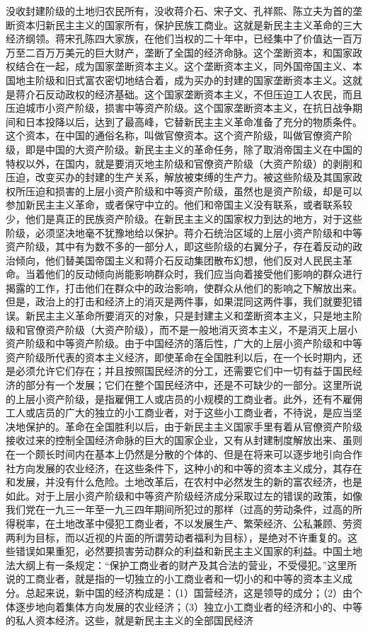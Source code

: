 \documentclass[UTF-8, a5paper, 12pt]{ctexart}
\begin{document}
没收封建阶级的土地归农民所有，没收蒋介石、宋子文、孔祥熙、陈立夫为首的垄断资本归新民主主义的国家所有，保护民族工商业。这就是新民主主义革命的三大经济纲领。蒋宋孔陈四大家族，在他们当权的二十年中，已经集中了价值达一百万万至二百万万美元的巨大财产，垄断了全国的经济命脉。这个垄断资本，和国家政权结合在一起，成为国家垄断资本主义。这个垄断资本主义，同外国帝国主义、本国地主阶级和旧式富农密切地结合着，成为买办的封建的国家垄断资本主义。这就是蒋介石反动政权的经济基础。这个国家垄断资本主义，不但压迫工人农民，而且压迫城市小资产阶级，损害中等资产阶级。这个国家垄断资本主义，在抗日战争期间和日本投降以后，达到了最高峰，它替新民主主义革命准备了充分的物质条件。这个资本，在中国的通俗名称，叫做官僚资本。这个资产阶级，叫做官僚资产阶级，即是中国的大资产阶级。新民主主义的革命任务，除了取消帝国主义在中国的特权以外，在国内，就是要消灭地主阶级和官僚资产阶级（大资产阶级）的剥削和压迫，改变买办的封建的生产关系，解放被束缚的生产力。被这些阶级及其国家政权所压迫和损害的上层小资产阶级和中等资产阶级，虽然也是资产阶级，却是可以参加新民主主义革命，或者保守中立的。他们和帝国主义没有联系，或者联系较少，他们是真正的民族资产阶级。在新民主主义的国家权力到达的地方，对于这些阶级，必须坚决地毫不犹豫地给以保护。蒋介石统治区域的上层小资产阶级和中等资产阶级，其中有为数不多的一部分人，即这些阶级的右翼分子，存在着反动的政治倾向，他们替美国帝国主义和蒋介石反动集团散布幻想，他们反对人民民主革命。当着他们的反动倾向尚能影响群众时，我们应当向着接受他们影响的群众进行揭露的工作，打击他们在群众中的政治影响，使群众从他们的影响之下解放出来。但是，政治上的打击和经济上的消灭是两件事，如果混同这两件事，我们就要犯错误。新民主主义革命所要消灭的对象，只是封建主义和垄断资本主义，只是地主阶级和官僚资产阶级（大资产阶级），而不是一般地消灭资本主义，不是消灭上层小资产阶级和中等资产阶级。由于中国经济的落后性，广大的上层小资产阶级和中等资产阶级所代表的资本主义经济，即使革命在全国胜利以后，在一个长时期内，还是必须允许它们存在；并且按照国民经济的分工，还需要它们中一切有益于国民经济的部分有一个发展；它们在整个国民经济中，还是不可缺少的一部分。这里所说的上层小资产阶级，是指雇佣工人或店员的小规模的工商业者。此外，还有不雇佣工人或店员的广大的独立的小工商业者，对于这些小工商业者，不待说，是应当坚决地保护的。革命在全国胜利以后，由于新民主主义国家手里有着从官僚资产阶级接收过来的控制全国经济命脉的巨大的国家企业，又有从封建制度解放出来、虽则在一个颇长时间内在基本上仍然是分散的个体的、但是在将来可以逐步地引向合作社方向发展的农业经济，在这些条件下，这种小的和中等的资本主义成分，其存在和发展，并没有什么危险。土地改革后，在农村中必然发生的新的富农经济，也是如此。对于上层小资产阶级和中等资产阶级经济成分采取过左的错误的政策，如像我们党在一九三一年至一九三四年期间所犯过的那样（过高的劳动条件，过高的所得税率，在土地改革中侵犯工商业者，不以发展生产、繁荣经济、公私兼顾、劳资两利为目标，而以近视的片面的所谓劳动者福利为目标），是绝对不许重复的。这些错误如果重犯，必然要损害劳动群众的利益和新民主主义国家的利益。中国土地法大纲上有一条规定：“保护工商业者的财产及其合法的营业，不受侵犯。”这里所说的工商业者，就是指的一切独立的小工商业者和一切小的和中等的资本主义成分。总起来说，新中国的经济构成是：（1）国营经济，这是领导的成分；（2）由个体逐步地向着集体方向发展的农业经济；（3）独立小工商业者的经济和小的、中等的私人资本经济。这些，就是新民主主义的全部国民经济
\end{document}
